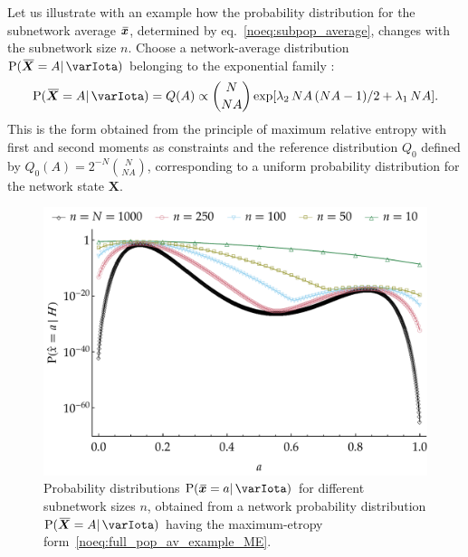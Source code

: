 \documentclass{article}
\theoremstyle{remark}
\theoremstyle{innote}
\newcommand*{\citep}{\parencites}
\renewcommand*{\|}{\mathpunct{|}}%
\newcommand*{\p}{\mathrm{P}}%
\newcommand*{\sect}{\S}%
\newcommand*{\eqn}{eq.}%
\newcommand*{\eg}{{e.g.}}
\theoremstyle{simple}
\newcommand*{\widebar}[1]{{\mkern1.5mu\skew{2}\overline{\mkern-1.5mu#1\mkern-1.5mu}\mkern 1.5mu}}
\newcommand*{\av}{\widebar} %
\newcommand*{\sav}{\widebar} %
\newcommand*{\yxx}{x}%
\newcommand*{\yx}{\bm{\yxx}}%
\newcommand*{\yxs}{\sav{\yx}}%
\newcommand*{\yX}{\bm{X}}%
\newcommand*{\yXf}{\av{\yX}}%
\newcommand*{\yH}{\varIota}
\newcommand*{\yl}{\lambda}
\begin{document}
Let us illustrate with an example how the probability distribution for the
subnetwork average $\yxs$, determined by \eqn~\eqref{noeq:subpop_average},
changes with the subnetwork size $n$. Choose a network-average distribution
$\p(\yXf=A\| \yH)$ belonging to the exponential family
\cites[\sect~4.5.3]{bernardoetal1994}[see also][]{fortinietal2000}:
\begin{equation}
  \label{noeq:full_pop_av_example_ME}
  \p(\yXf = A \| \yH) = Q(A) \propto
\binom{N}{N A}\exp[
\yl_2\, N A\,(N A-1)/2 + \yl_1\, N A].
\end{equation}
This is the form obtained from the principle of maximum relative entropy
\citep[\eg:][]{jaynes1957,jaynes1963,good1963,jaynes1967,aczeletal1975,jaynes1979b,vancampenhoutetal1981,sivia1990,fangetal1997,bretthorst2013}
with first and second moments as constraints and the reference distribution
$Q_0$ defined by $Q_0(A) = 2^{-N}\binom{N}{N A}$, corresponding to a
uniform probability distribution for the network state $\yX$.
\begin{figure}[!b]
\centering
\includegraphics[width=0.95\columnwidth]{scaled_subpop_probs.pdf}%
\caption{Probability distributions $\p(\yxs = a \| \yH)$ for different
  subnetwork sizes $n$, obtained from a network probability
  distribution $\p(\yXf = A \| \yH)$ having the maximum-etropy
  form~\eqref{noeq:full_pop_av_example_ME}.}
\label{noscaling_distr}
\end{figure}
\end{document}
